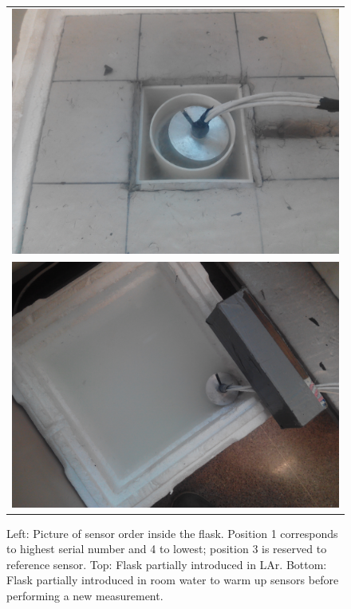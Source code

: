 \begin{figure}[htbp]
\begin{tabular}{ c }
\includegraphics[height=0.1665\textheight]{images/figure_8_b.jpg} \\
\includegraphics[height=0.1665\textheight]{images/figure_8_c.jpg}
\end{tabular}
\caption{Left: Picture of sensor order inside the flask. Position 1 corresponds to highest serial number and 4 to lowest; position 3 is reserved to reference sensor.
 Top: Flask partially introduced in LAr.
 Bottom: Flask partially introduced in room water to warm up sensors before performing a new measurement.
\label{fi:CAL_procedure}}
\end{figure}

